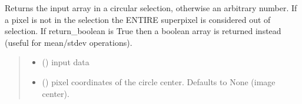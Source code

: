 \documentclass[letterpaper,10pt,english]{sphinxmanual}
\begin{document}
\begin{fulllineitems}
\label{\detokenize{micropolarray.processing:micropolarray.processing.nrgf.roi_from_polar}}
\pysigstartsignatures
{}
\pysigstopsignatures
\sphinxAtStartPar
Returns the input array in a circular selection, otherwise an arbitrary number. If a pixel is not in the selection the ENTIRE superpixel is considered out of selection. If return\_boolean is True then a boolean array is returned instead (useful for mean/stdev operations).
\begin{quote}\begin{description}
\begin{itemize}
\item {} 
\sphinxAtStartPar
{} () \textendash{} input data

\item {} 
\sphinxAtStartPar
{} (\sphinxstyleliteralemphasis{\sphinxupquote{, }}) \textendash{} pixel coordinates of the circle center. Defaults to None (image center).


\end{itemize}
\end{description}
\end{quote}
\end{fulllineitems}
\end{document}
